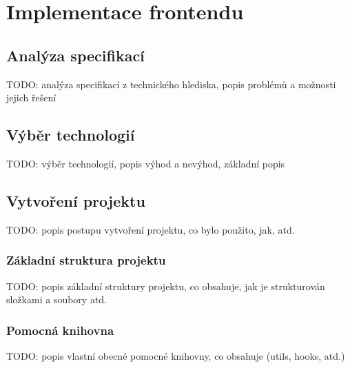 \chapter{Implementace frontendu}
\label{ch:implementace-frontendu}

\section{Analýza specifikací}
\label{sec:implementace-analyza}
TODO: analýza specifikací z technického hlediska, popis problémů a možnosti jejich řešení

\section{Výběr technologií}
\label{sec:implementace-vyber-technologii}
TODO: výběr technologií, popis výhod a nevýhod, základní popis

\section{Vytvoření projektu}
\label{sec:implementace-vytvoreni-projektu}
TODO: popis postupu vytvoření projektu, co bylo použito, jak, atd.

\subsection{Základní struktura projektu}
\label{sec:implementace-vytvoreni-projektu-zakladni-struktura}
TODO: popis základní struktury projektu, co obsahuje, jak je strukturován složkami a soubory atd.

\subsection{Pomocná knihovna}
\label{sec:implementace-vytvoreni-projektu-pomocna-knihovna}
TODO: popis vlastní obecné pomocné knihovny, co obsahuje (utils, hooks, atd.)

